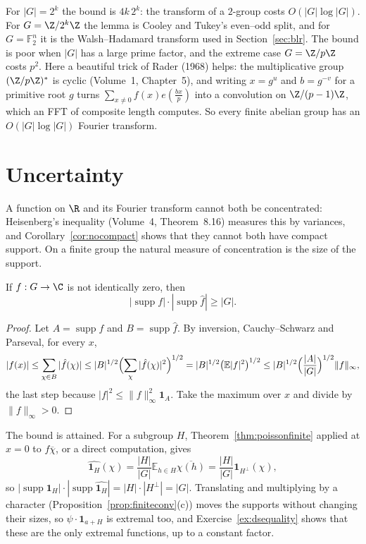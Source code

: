 For $|G|=2^k$ the bound is $4k\,2^k$: the transform of a $2$-group costs $O(|G|\log|G|)$. For $G=\Z/2^k\Z$ the lemma is Cooley and
Tukey's even--odd split, and for $G=\mathbb F_2^n$ it is the Walsh--Hadamard transform used in Section~\ref{sec:blr}. The bound is poor
when $|G|$ has a large prime factor, and the extreme case $G=\Z/p\Z$ costs $p^2$. Here a beautiful trick of Rader (1968) helps: the
multiplicative group $(\Z/p\Z)^*$ is cyclic (Volume~1, Chapter~5), and writing $x=g^u$ and $b=g^{-v}$ for a primitive root $g$ turns
$\sum_{x\ne0}f(x)e(\frac{bx}p)$ into a convolution on $\Z/(p-1)\Z$, which an FFT of composite length computes. So every finite abelian group
has an $O(|G|\log|G|)$ Fourier transform.

\section{Uncertainty}

A function on $\R$ and its Fourier transform cannot both be concentrated: Heisenberg's inequality (Volume~4, Theorem~8.16) measures this
by variances, and Corollary~\ref{cor:nocompact} shows that they cannot both have compact support. On a finite group the natural measure
of concentration is the size of the support.

\begin{theorem}\label{thm:donohostark}
If $f:G\to\C$ is not identically zero, then
\[|\operatorname{supp}f|\cdot|\operatorname{supp}\hat f|\ge|G|.\]
\end{theorem}
\begin{proof}
Let $A=\operatorname{supp}f$ and $B=\operatorname{supp}\hat f$. By inversion, Cauchy--Schwarz and Parseval, for every $x$,
\[|f(x)|\le\sum_{\chi\in B}|\hat f(\chi)|\le|B|^{1/2}\Bigl(\sum_\chi|\hat f(\chi)|^2\Bigr)^{1/2}=|B|^{1/2}\bigl(\mathbb E|f|^2\bigr)^{1/2}\le|B|^{1/2}\Bigl(\frac{|A|}{|G|}\Bigr)^{1/2}\|f\|_\infty,\]
the last step because $|f|^2\le\|f\|_\infty^2\mathbf 1_A$. Take the maximum over $x$ and divide by $\|f\|_\infty>0$.
\end{proof}

The bound is attained. For a subgroup $H$, Theorem~\ref{thm:poissonfinite} applied at $x=0$ to $f\overline\chi$, or a direct computation,
gives
\[\widehat{\mathbf 1_H}(\chi)=\frac{|H|}{|G|}\mathbb E_{h\in H}\overline{\chi(h)}=\frac{|H|}{|G|}\mathbf 1_{H^\perp}(\chi),\]
so $|\operatorname{supp}\mathbf 1_H|\cdot|\operatorname{supp}\widehat{\mathbf 1_H}|=|H|\cdot|H^\perp|=|G|$. Translating and multiplying by a character
(Proposition~\ref{prop:finiteconv}(c)) moves the supports without changing their sizes, so $\psi\cdot\mathbf 1_{a+H}$ is extremal too, and
Exercise~\ref{ex:dsequality} shows that these are the only extremal functions, up to a constant factor.

